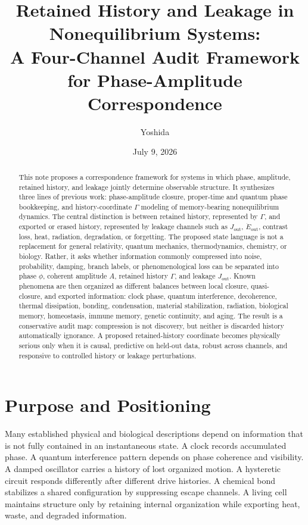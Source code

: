\documentclass[11pt,a4paper]{article}
\title{Retained History and Leakage in Nonequilibrium Systems:\\
A Four-Channel Audit Framework for Phase-Amplitude Correspondence}
\author{Yoshida}
\date{July 9, 2026}
\newcommand{\Ghist}{\Gamma}
\newcommand{\Jout}{J_{\mathrm{out}}}
\begin{document}
\maketitle

\begin{abstract}
This note proposes a correspondence framework for systems in which phase, amplitude, retained history, and leakage jointly determine observable structure.  It synthesizes three lines of previous work: phase-amplitude closure, proper-time and quantum phase bookkeeping, and history-coordinate \(\Ghist\) modeling of memory-bearing nonequilibrium dynamics.  The central distinction is between retained history, represented by \(\Ghist\), and exported or erased history, represented by leakage channels such as \(\Jout\), \(\dot E_{\mathrm{out}}\), contrast loss, heat, radiation, degradation, or forgetting.  The proposed state language is not a replacement for general relativity, quantum mechanics, thermodynamics, chemistry, or biology.  Rather, it asks whether information commonly compressed into noise, probability, damping, branch labels, or phenomenological loss can be separated into phase \(\phi\), coherent amplitude \(A\), retained history \(\Ghist\), and leakage \(\Jout\).  Known phenomena are then organized as different balances between local closure, quasi-closure, and exported information: clock phase, quantum interference, decoherence, thermal dissipation, bonding, condensation, material stabilization, radiation, biological memory, homeostasis, immune memory, genetic continuity, and aging.  The result is a conservative audit map: compression is not discovery, but neither is discarded history automatically ignorance.  A proposed retained-history coordinate becomes physically serious only when it is causal, predictive on held-out data, robust across channels, and responsive to controlled history or leakage perturbations.
\end{abstract}

\section{Purpose and Positioning}
Many established physical and biological descriptions depend on information that is not fully contained in an instantaneous state.  A clock records accumulated phase.  A quantum interference pattern depends on phase coherence and visibility.  A damped oscillator carries a history of lost organized motion.  A hysteretic circuit responds differently after different drive histories.  A chemical bond stabilizes a shared configuration by suppressing escape channels.  A living cell maintains structure only by retaining internal organization while exporting heat, waste, and degraded information.
\end{document}
